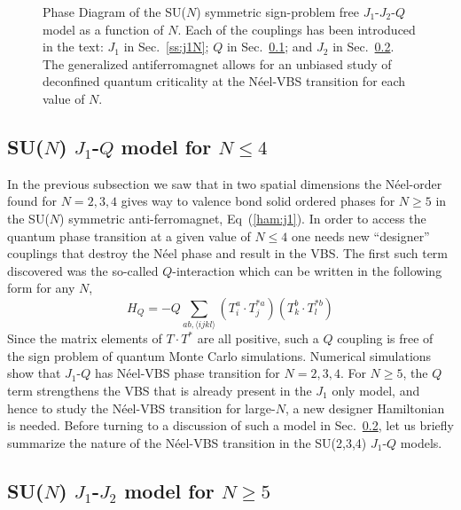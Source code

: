 \documentclass[range]{ar2e}
\begin{document}
\begin{figure}
\centerline{}
  \caption{ \label{fig:pdj1j2q} Phase Diagram of the
    SU($N$) symmetric sign-problem free
    $J_1$-$J_2$-$Q$ model as a function of $N$. Each of the couplings has been introduced
    in the text: $J_1$ in Sec.~\ref{ss:j1N}; $Q$ in Sec.~\ref{ss:jqN};
  and $J_2$ in Sec.~\ref{ss:j1j2N}. The generalized antiferromagnet
  allows for an unbiased study of deconfined quantum
  criticality at the N\'eel-VBS transition for each value of $N$. }
\end{figure}


\subsection{SU($N$) $J_1$-$Q$ model for $N\leq 4$}
\label{ss:jqN}
In the previous subsection we saw that in two spatial dimensions the
N\'eel-order found for $N=2,3,4$ gives way to valence bond solid
ordered phases for $N\geq 5$ in the SU($N$) symmetric
anti-ferromagnet, Eq~(\ref{ham:j1}). In order to access the quantum
phase transition at a given value of $N\leq 4$ one needs new
``designer'' couplings that
destroy the N\'eel phase and result in the VBS. The first such term discovered was
the so-called $Q$-interaction which can be written in the following
form for any $N$,
\begin{equation}
H_{Q} = - Q \sum_{ab,\langle ijkl \rangle} \left ( T^a_i\cdot
  T^{*a}_j\right ) \left ( T^b_k\cdot T^{*b}_l \right )
\end{equation}
Since the matrix elements of $T\cdot T^*$ are all positive, such a $Q$
coupling is free of the sign problem of quantum Monte Carlo
simulations. Numerical simulations show that $J_1$-$Q$ has N\'eel-VBS
phase transition for $N=2,3,4$. For $N\geq 5$, the $Q$ term strengthens
the VBS that is already present in the $J_1$ only model, and hence to
study the N\'eel-VBS transition for large-$N$, a new designer
Hamiltonian is needed. Before turning to a discussion of such a model in
Sec.~\ref{ss:j1j2N}, let us briefly summarize the nature of the
N\'eel-VBS transition in the SU(2,3,4) $J_1$-$Q$ models.


\subsection{SU($N$) $J_1$-$J_2$ model for $N\geq 5$}
\label{ss:j1j2N}
\end{document}

